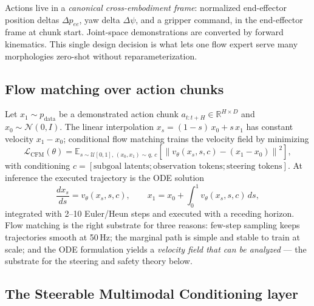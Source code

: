 \documentclass[11pt,a4paper]{article}
\begin{document}
Actions live in a \emph{canonical cross-embodiment frame}: normalized end-effector
position deltas $\Delta p_{ee}$, yaw delta $\Delta\psi$, and a gripper command, in
the end-effector frame at chunk start. Joint-space demonstrations are converted
by forward kinematics. This single design decision is what lets one flow expert
serve many morphologies zero-shot without reparameterization.

\subsection{Flow matching over action chunks}
\label{sec:flow}

Let $x_1 \sim p_{\mathrm{data}}$ be a demonstrated action chunk
$a_{t:t+H} \in \mathbb{R}^{H \times D}$ and $x_0 \sim \mathcal{N}(0,I)$. The linear
interpolation $x_s = (1-s)\,x_0 + s\,x_1$ has constant velocity $x_1 - x_0$;
conditional flow matching trains the velocity field by minimizing
\begin{equation}
\mathcal{L}_{\mathrm{CFM}}(\theta)
= \mathbb{E}_{s \sim \mathcal{U}[0,1],\, (x_0,x_1) \sim q,\, c}
\left[ \left\| v_\theta(x_s, s, c) - (x_1 - x_0) \right\|^2 \right],
\label{eq:cfm}
\end{equation}
with conditioning $c = [\text{subgoal latents}; \text{observation tokens};
\text{steering tokens}]$. At inference the executed trajectory is the ODE
solution
\begin{equation}
\frac{dx_s}{ds} = v_\theta(x_s, s, c), \qquad
x_1 = x_0 + \int_0^1 v_\theta(x_s, s, c)\, ds,
\label{eq:ode}
\end{equation}
integrated with 2--10 Euler/Heun steps and executed with a receding horizon.
Flow matching is the right substrate for three reasons: few-step sampling keeps
trajectories smooth at 50\,Hz; the marginal path is simple and stable to train at
scale; and the ODE formulation yields a \emph{velocity field that can be
analyzed} --- the substrate for the steering and safety theory below.

\subsection{The Steerable Multimodal Conditioning layer}
\label{sec:smc}
\end{document}
